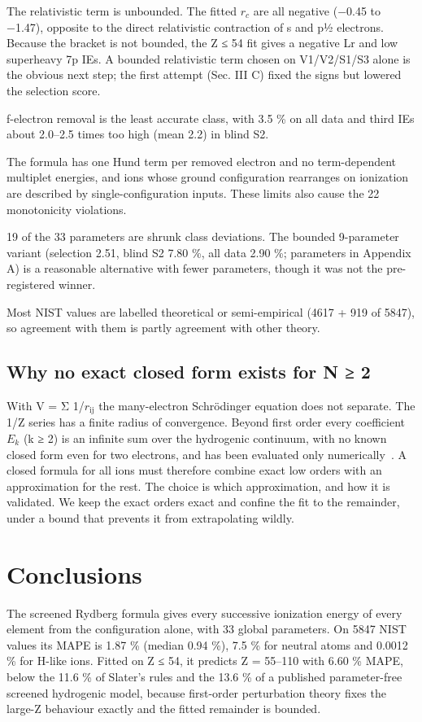 \documentclass[aps,pra,preprint,notitlepage,superscriptaddress,amsmath,amssymb]{revtex4-2}
\begin{document}
The relativistic term is unbounded. The fitted $r_{c}$ are all negative (−0.45 to −1.47), opposite to the direct relativistic contraction of s and p½ electrons. Because the bracket is not bounded, the Z ≤ 54 fit gives a negative Lr and low superheavy 7p IEs. A bounded relativistic term chosen on V1/V2/S1/S3 alone is the obvious next step; the first attempt (Sec. III C) fixed the signs but lowered the selection score.


f-electron removal is the least accurate class, with 3.5 \% on all data and third IEs about 2.0–2.5 times too high (mean 2.2) in blind S2.


The formula has one Hund term per removed electron and no term-dependent multiplet energies, and ions whose ground configuration rearranges on ionization are described by single-configuration inputs. These limits also cause the 22 monotonicity violations.


19 of the 33 parameters are shrunk class deviations. The bounded 9-parameter variant (selection 2.51, blind S2 7.80 \%, all data 2.90 \%; parameters in Appendix A) is a reasonable alternative with fewer parameters, though it was not the pre-registered winner.


Most NIST values are labelled theoretical or semi-empirical (4617 + 919 of 5847), so agreement with them is partly agreement with other theory.


\subsection{Why no exact closed form exists for N ≥ 2}

With V = Σ 1/$r_{\mathrm{ij}}$ the many-electron Schrödinger equation does not separate. The 1/Z series has a finite radius of convergence. Beyond first order every coefficient $E_{k}$ (k ≥ 2) is an infinite sum over the hydrogenic continuum, with no known closed form even for two electrons, and has been evaluated only numerically~\cite{r6}. A closed formula for all ions must therefore combine exact low orders with an approximation for the rest. The choice is which approximation, and how it is validated. We keep the exact orders exact and confine the fit to the remainder, under a bound that prevents it from extrapolating wildly.


\section{Conclusions}

The screened Rydberg formula gives every successive ionization energy of every element from the configuration alone, with 33 global parameters. On 5847 NIST values its MAPE is 1.87 \% (median 0.94 \%), 7.5 \% for neutral atoms and 0.0012 \% for H-like ions. Fitted on Z ≤ 54, it predicts Z = 55–110 with 6.60 \% MAPE, below the 11.6 \% of Slater's rules and the 13.6 \% of a published parameter-free screened hydrogenic model, because first-order perturbation theory fixes the large-Z behaviour exactly and the fitted remainder is bounded.
\end{document}
